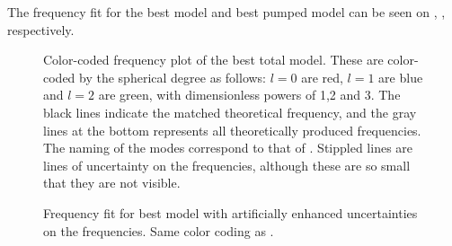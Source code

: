  The frequency fit for the best model and best pumped model can be seen on , , respectively. 
 
 \begin{figure}[htbp]
 	\centering
 	\caption{Color-coded frequency plot of the best total model.  These are color-coded by the spherical degree as follows: $l=0$ are red, $l=1$ are blue and  $l=2$ are green, with dimensionless powers of 1,2 and 3. The black lines indicate the matched theoretical frequency, and the gray lines at the bottom represents all theoretically produced frequencies. The naming of the modes correspond to that of \citet{lenz2010delta}. Stippled lines are lines of uncertainty on the frequencies, although these are so small that they are not visible.}
 	\label{freqfitbest}
 \end{figure}
\begin{figure}[htbp]
	\centering
	\caption{Frequency fit for best model with artificially enhanced uncertainties on the frequencies. Same color coding as .}
	\label{freqfitpumped}
\end{figure}
 
